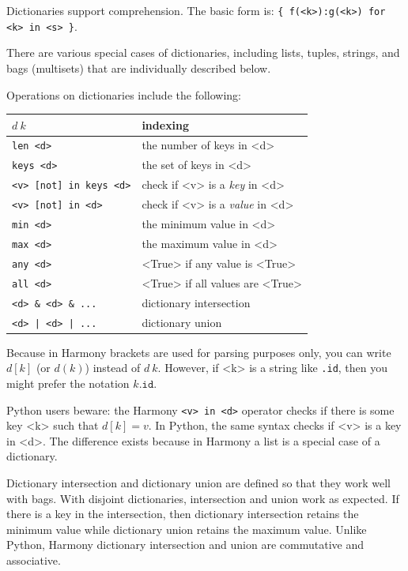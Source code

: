 \documentclass{report}
\begin{document}
{Dictionaries support comprehension.  The basic form is:
\texttt{\{ f(<{k}>):g(<{k}>) for <{k}> in <{s}> \}}.

There are various special cases of dictionaries,
including lists, tuples, strings,
and bags (multisets) that are individually described below.

Operations on dictionaries include the following:

\begin{center}
\begin{tabular}{|l|l|}
\hline
\texttt{$d~k$} & indexing \\
\hline
\texttt{len <{d}>} & the number of keys in <{d}> \\
\hline
\texttt{keys <{d}>} & the set of keys in <{d}> \\
\hline
\texttt{<{v}> [not] in keys <{d}>} & check if <{v}> is a \emph{key} in <{d}> \\
\hline
\texttt{<{v}> [not] in <{d}>} & check if <{v}> is a \emph{value} in <{d}> \\
\hline
\texttt{min <{d}>} & the minimum value in <{d}> \\
\hline
\texttt{max <{d}>} & the maximum value in <{d}> \\
\hline
\texttt{any <{d}>} & <{True}> if any value is <{True}> \\
\hline
\texttt{all <{d}>} & <{True}> if all values are <{True}> \\
\hline
\texttt{<{d}> \& <{d}> \& ...} & dictionary intersection \\
\hline
\texttt{<{d}> | <{d}> | ...} & dictionary union \\
\hline
\end{tabular}
\end{center}

Because in Harmony brackets are used for parsing purposes only,
you can write $d[k]$ (or $d(k)$) instead of $d~k$.
However, if <{k}> is a string like \texttt{.id}, then you might
prefer the notation $k\mathtt{.id}$.

Python users beware: the Harmony \texttt{<{v}> in <{d}>} operator checks
if there is some key <{k}> such that $d[k] = v$.  In Python, the same
syntax checks if <{v}> is a key in <{d}>.  The difference exists because
in Harmony a list is a special case of a dictionary.

Dictionary intersection and dictionary union are defined so that
they work well with bags.  With disjoint dictionaries, intersection
and union work as expected.  If there is a key in the intersection, then
dictionary intersection retains the minimum value while dictionary
union retains the maximum value.  Unlike Python, Harmony
dictionary intersection and union are commutative and associative.

}
\end{document}
